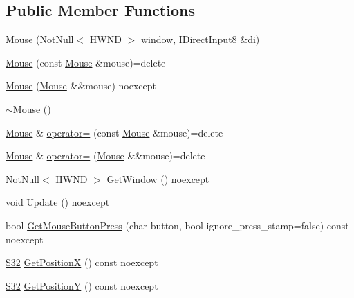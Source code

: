 \subsection*{Public Member Functions}
\begin{DoxyCompactItemize}
\item 
\hyperlink{classmage_1_1input_1_1_mouse_add3fd231e5af4f3669eaa8d5f8d157ec}{Mouse} (\hyperlink{namespacemage_a8769f9d670d6b585ea306cb1062af94b}{Not\+Null}$<$ H\+W\+ND $>$ window, I\+Direct\+Input8 \&di)
\item 
\hyperlink{classmage_1_1input_1_1_mouse_a4f560bb3a59f6cee57e7cd03b24ef218}{Mouse} (const \hyperlink{classmage_1_1input_1_1_mouse}{Mouse} \&mouse)=delete
\item 
\hyperlink{classmage_1_1input_1_1_mouse_a6e8185b9b2f0fdcd63a191389eb2b050}{Mouse} (\hyperlink{classmage_1_1input_1_1_mouse}{Mouse} \&\&mouse) noexcept
\item 
\hyperlink{classmage_1_1input_1_1_mouse_abfc6391c896b029e38ffa1341dcf9963}{$\sim$\+Mouse} ()
\item 
\hyperlink{classmage_1_1input_1_1_mouse}{Mouse} \& \hyperlink{classmage_1_1input_1_1_mouse_af4ce64a7808af28c80bc9c01c83f7d14}{operator=} (const \hyperlink{classmage_1_1input_1_1_mouse}{Mouse} \&mouse)=delete
\item 
\hyperlink{classmage_1_1input_1_1_mouse}{Mouse} \& \hyperlink{classmage_1_1input_1_1_mouse_a05d2471a4f517cc1970df352e7a68724}{operator=} (\hyperlink{classmage_1_1input_1_1_mouse}{Mouse} \&\&mouse)=delete
\item 
\hyperlink{namespacemage_a8769f9d670d6b585ea306cb1062af94b}{Not\+Null}$<$ H\+W\+ND $>$ \hyperlink{classmage_1_1input_1_1_mouse_a5fd893af2aede58106b718448e7e0dde}{Get\+Window} () noexcept
\item 
void \hyperlink{classmage_1_1input_1_1_mouse_aa4eb9865206c2b946f8d21106d378907}{Update} () noexcept
\item 
bool \hyperlink{classmage_1_1input_1_1_mouse_a1aed699ffd28b121e9da426113937f85}{Get\+Mouse\+Button\+Press} (char button, bool ignore\+\_\+press\+\_\+stamp=false) const noexcept
\item 
\hyperlink{namespacemage_a642e05c5c83642b6946703615cdbf2da}{S32} \hyperlink{classmage_1_1input_1_1_mouse_a208f26babea7ac6e07af5f79600e22ae}{Get\+PositionX} () const noexcept
\item 
\hyperlink{namespacemage_a642e05c5c83642b6946703615cdbf2da}{S32} \hyperlink{classmage_1_1input_1_1_mouse_a81bf0ebd5fb34a25ba9f5d4c7aea1ed6}{Get\+PositionY} () const noexcept

\end{DoxyCompactItemize}
